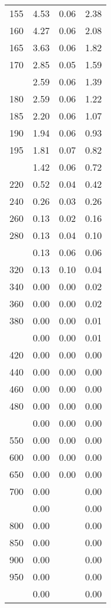 \begin{table}[ht]
\begin{tabular}{lccc}
  155 & 4.53 & 0.06 & 2.38 \\ 
  160 & 4.27 & 0.06 & 2.08 \\ 
  165 & 3.63 & 0.06 & 1.82 \\ 
  170 & 2.85 & 0.05 & 1.59 \\ 
   \addlinespace
175 & 2.59 & 0.06 & 1.39 \\ 
  180 & 2.59 & 0.06 & 1.22 \\ 
  185 & 2.20 & 0.06 & 1.07 \\ 
  190 & 1.94 & 0.06 & 0.93 \\ 
  195 & 1.81 & 0.07 & 0.82 \\ 
   \addlinespace
200 & 1.42 & 0.06 & 0.72 \\ 
  220 & 0.52 & 0.04 & 0.42 \\ 
  240 & 0.26 & 0.03 & 0.26 \\ 
  260 & 0.13 & 0.02 & 0.16 \\ 
  280 & 0.13 & 0.04 & 0.10 \\ 
   \addlinespace
300 & 0.13 & 0.06 & 0.06 \\ 
  320 & 0.13 & 0.10 & 0.04 \\ 
  340 & 0.00 & 0.00 & 0.02 \\ 
  360 & 0.00 & 0.00 & 0.02 \\ 
  380 & 0.00 & 0.00 & 0.01 \\ 
   \addlinespace
400 & 0.00 & 0.00 & 0.01 \\ 
  420 & 0.00 & 0.00 & 0.00 \\ 
  440 & 0.00 & 0.00 & 0.00 \\ 
  460 & 0.00 & 0.00 & 0.00 \\ 
  480 & 0.00 & 0.00 & 0.00 \\ 
   \addlinespace
500 & 0.00 & 0.00 & 0.00 \\ 
  550 & 0.00 & 0.00 & 0.00 \\ 
  600 & 0.00 & 0.00 & 0.00 \\ 
  650 & 0.00 & 0.00 & 0.00 \\ 
  700 & 0.00 &  & 0.00 \\ 
   \addlinespace
750 & 0.00 &  & 0.00 \\ 
  800 & 0.00 &  & 0.00 \\ 
  850 & 0.00 &  & 0.00 \\ 
  900 & 0.00 &  & 0.00 \\ 
  950 & 0.00 &  & 0.00 \\ 
   \addlinespace
1000 & 0.00 &  & 0.00 \\ 
   \bottomrule
\end{tabular}
\end{table}
